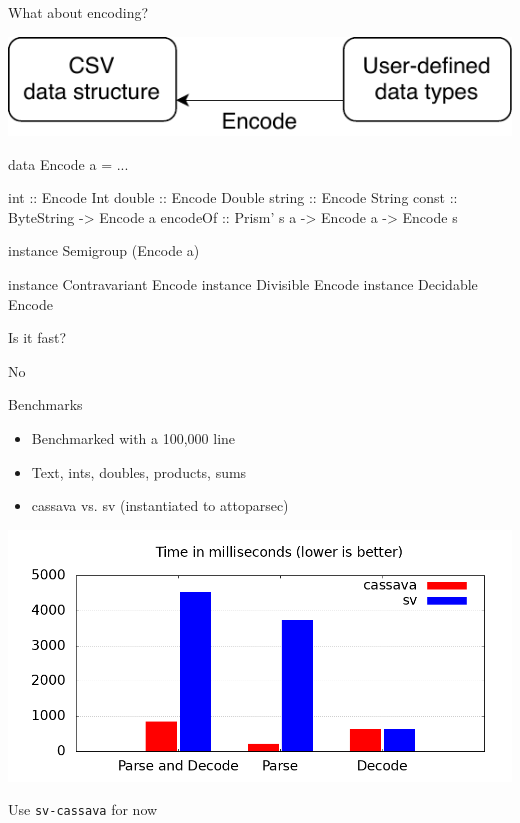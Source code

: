 \documentclass[UKenglish,usenames,dvipsnames,svgnames,table,aspectratio=169,mathserif]{beamer}
\newcommand{\nl}{\vspace{\baselineskip}}
\newcommand{\pnl}{\pause \nl}
\begin{document}
\begin{frame}
\Large \centering

What about encoding?

\nl
\includegraphics{encode.pdf}
\end{frame}


\begin{frame}[fragile]
\begin{haskellcode}
data Encode a = ...
\end{haskellcode}
\pnl
\begin{haskellcode}
int    :: Encode Int
double :: Encode Double
string :: Encode String
const  :: ByteString -> Encode a
encodeOf :: Prism' s a -> Encode a -> Encode s
\end{haskellcode}
\pnl
\begin{haskellcode}
instance Semigroup     (Encode a)

instance Contravariant  Encode
instance Divisible      Encode
instance Decidable      Encode
\end{haskellcode}
\end{frame}


\begin{frame}
\Huge \centering
Is it fast?

\pnl
No
\end{frame}


\begin{frame}

Benchmarks
\begin{itemize}
\item Benchmarked with a 100,000 line
\item Text, ints, doubles, products, sums
\item cassava vs. sv (instantiated to attoparsec)
\end{itemize}
\end{frame}


\begin{frame}
\centering
\includegraphics[scale=0.5]{data/bench.png}

\pnl

Use {\tt sv-cassava} for now
\end{frame}
\end{document}
